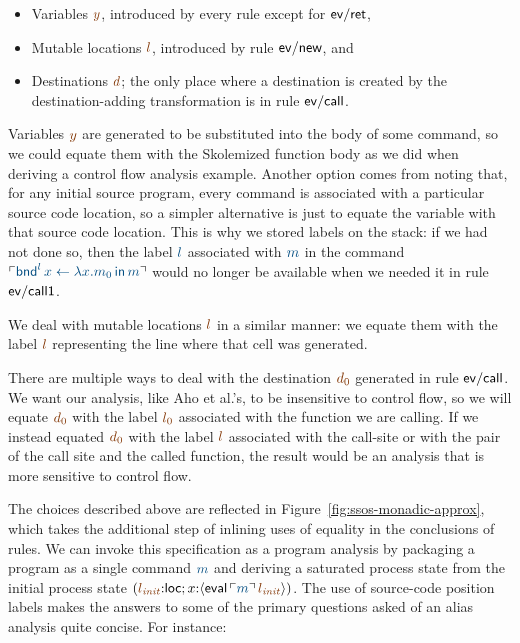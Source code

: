 \smallskip
\begin{itemize}
\item Variables $\lf{y}$, introduced by every rule except for ${\sf ev/ret}$,
\item Mutable locations $\lf{l}$, introduced by rule ${\sf ev/new}$, and 
\item Destinations $\lf{d}$; the only place where a destination is created
by the destination-adding transformation is in rule ${\sf ev/call}$.
\end{itemize}
\smallskip

Variables $\lf{y}$ are generated to be substituted into the body of some
command, so we could equate them with the Skolemized function body as
we did when deriving a control flow analysis example. Another option
comes from noting that, for any initial source program, every command
is associated with a particular source code location, so a simpler
alternative is just to equate the variable with that source code
location. This is why we stored labels on the stack: if we had not
done so, then the label $\obj{l}$ associated with $\obj{m}$ in the command
$\interp{{\sf bnd}^l\, x \leftarrow \lambda x.m_0 \,{\sf in}\,m}$ would
no longer be available when we needed it in rule ${\sf ev/call1}$.

We deal with mutable locations $\lf{l}$ in a similar manner: we equate them
with the label $\lf{l}$ representing the line where that cell was
generated.

There are multiple ways to deal with the destination $\lf{d_0}$ generated
in rule ${\sf ev/call}$. We want our analysis, like Aho et al.'s, to
be insensitive to control flow, so we will equate $\lf{d_0}$ with the label
$\lf{l_0}$ associated with the function we are calling.  If we instead
equated $\lf{d_0}$ with the label $\lf{l}$ associated with the call-site or with
the pair of the call site and the called function, the result would be
an analysis that is more sensitive to control flow.

The choices described above are reflected in
Figure~\ref{fig:ssos-monadic-approx}, which takes the additional step
of inlining uses of equality in the conclusions of rules. We can
invoke this specification as a program analysis by packaging a program
as a single command $\obj{m}$ and deriving a saturated process state from the
initial process state $(\lf{l_{\it init}}{:}{\sf loc}; x{:}\susp{{\sf
    eval}\,\interp{m}\,\lf{l_{\it init}}})$. 
The use of source-code position labels
makes the answers to some of the primary questions asked of an alias
analysis quite concise. For instance:

